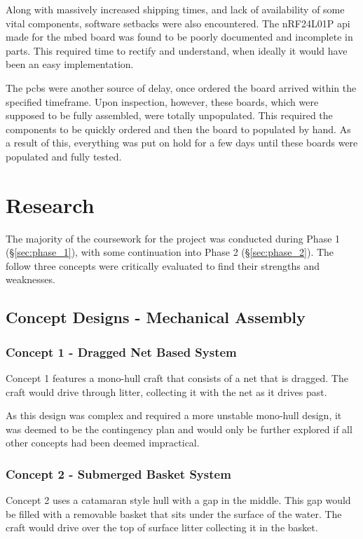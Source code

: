 \documentclass [11pt]{article}
\begin{document}
Along with massively increased shipping times, and lack of availability of some vital components, software setbacks were also encountered. The nRF24L01P \gls{api} made for the \gls{mbed} board was found to be poorly documented and incomplete in parts. This required time to rectify and understand, when ideally it would have been an easy implementation. 

The \gls{pcb}s were another source of delay, once ordered the board arrived within the specified timeframe. Upon inspection, however, these boards, which were supposed to be fully assembled, were totally unpopulated. This required the components to be quickly ordered and then the board to populated by hand. As a result of this, everything was put on hold for a few days until these boards were populated and fully tested. 

\section{Research}\label{sec:research}

The majority of the coursework for the project was conducted during Phase 1 (§\ref{sec:phase_1}), with some continuation into Phase 2 (§\ref{sec:phase_2}). The follow three concepts were critically evaluated to find their strengths and weaknesses. 

\subsection{Concept Designs - Mechanical Assembly}
\subsubsection{Concept 1 - Dragged Net Based System}
Concept 1 features a mono-hull craft that consists of a net that is dragged. The craft would drive through litter, collecting it with the net as it drives past. 

As this design was complex and required a more unstable mono-hull design, it was deemed to be the contingency plan and would only be further explored if all other concepts had been deemed impractical.

\subsubsection{Concept 2 - Submerged Basket System}
Concept 2 uses a catamaran style hull with a gap in the middle. This gap would be filled with a removable basket that sits under the surface of the water. The craft would drive over the top of surface litter collecting it in the basket.  
\end{document}
